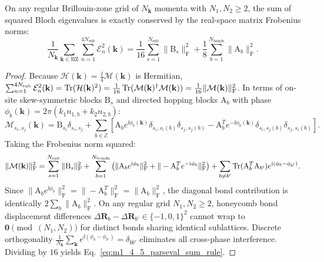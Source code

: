 \begin{theorem}
\label{thm:m1_4_5_parseval_frobenius}
On any regular Brillouin-zone grid of $N_{\mathbf{k}}$ momenta with $N_1, N_2 \ge 2$, the sum of squared Bloch eigenvalues is exactly conserved by the real-space matrix Frobenius norms:
\begin{equation}
\label{eq:m1_4_5_parseval_sum_rule}
\frac{1}{N_{\mathbf{k}}} \sum_{\mathbf{k} \in \mathrm{BZ}} \sum_{n=1}^{4N_{\mathrm{sub}}} \mathcal{E}_n^2(\mathbf{k}) = \frac{1}{16} \sum_{s=1}^{N_{\mathrm{sub}}} \|\mathrm{B}_s\|_{\mathrm{F}}^2 + \frac{1}{8} \sum_{b=1}^{N_{\mathrm{bonds}}} \|\mathrm{A}_b\|_{\mathrm{F}}^2.
\end{equation}
\end{theorem}
\begin{proof}
Because $\mathcal{H}(\mathbf{k}) = \frac{\ii}{4}\mathcal{M}(\mathbf{k})$ is Hermitian, $\sum_{n=1}^{4N_{\mathrm{sub}}} \mathcal{E}_n^2(\mathbf{k}) = \operatorname{Tr}(\mathcal{H}(\mathbf{k})^2) = \frac{1}{16} \operatorname{Tr}(\mathcal{M}(\mathbf{k})^\dagger \mathcal{M}(\mathbf{k})) = \frac{1}{16} \|\mathcal{M}(\mathbf{k})\|_{\mathrm{F}}^2$.
In terms of on-site skew-symmetric blocks $\mathrm{B}_s$ and directed hopping blocks $\mathrm{A}_b$ with phase $\phi_b(\mathbf{k}) = 2\pi (k_1 n_{1,b} + k_2 n_{2,b})$:
\begin{equation}
\mathcal{M}_{s_i, s_j}(\mathbf{k}) = \mathrm{B}_{s_i} \delta_{s_i, s_j} + \sum_{b \in \mathcal{E}} \left[ \mathrm{A}_b e^{\ii \phi_b(\mathbf{k})} \delta_{s_i, s_i(b)} \delta_{s_j, s_j(b)} - \mathrm{A}_b^T e^{-\ii \phi_b(\mathbf{k})} \delta_{s_i, s_j(b)} \delta_{s_j, s_i(b)} \right].
\end{equation}
Taking the Frobenius norm squared:
\begin{equation}
\|\mathcal{M}(\mathbf{k})\|_{\mathrm{F}}^2 = \sum_{s=1}^{N_{\mathrm{sub}}} \|\mathrm{B}_s\|_{\mathrm{F}}^2 + \sum_{b=1}^{N_{\mathrm{bonds}}} \left( \|\mathrm{A}_b e^{\mathrm{i} \phi_b}\|_{\mathrm{F}}^2 + \|-\mathrm{A}_b^T e^{-\mathrm{i} \phi_b}\|_{\mathrm{F}}^2 \right) + \sum_{b \ne b'} \operatorname{Tr}(\mathrm{A}_b^T \mathrm{A}_{b'}) e^{\mathrm{i} (\phi_b - \phi_{b'})}.
\end{equation}
Since $\|\mathrm{A}_b e^{\ii \phi_b}\|_{\mathrm{F}}^2 = \|-\mathrm{A}_b^T\|_{\mathrm{F}}^2 = \|\mathrm{A}_b\|_{\mathrm{F}}^2$, the diagonal bond contribution is identically $2 \sum_b \|\mathrm{A}_b\|_{\mathrm{F}}^2$.
On any regular grid $N_1, N_2 \ge 2$, honeycomb bond displacement differences $\Delta\mathbf{R}_b - \Delta\mathbf{R}_{b'} \in \{-1, 0, 1\}^2$ cannot wrap to $\mathbf{0} \pmod{(N_1, N_2)}$ for distinct bonds sharing identical sublattices. Discrete orthogonality $\frac{1}{N_{\mathbf{k}}} \sum_{\mathbf{k}} e^{\ii (\phi_b - \phi_{b'})} = \delta_{bb'}$ eliminates all cross-phase interference.
Dividing by $16$ yields Eq.~\eqref{eq:m1_4_5_parseval_sum_rule}.
\end{proof}

